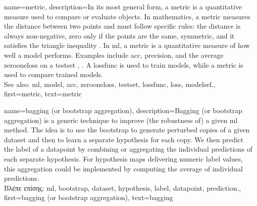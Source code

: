 {name={metric},
	description={In its most general form, a metric is a quantitative measure used to compare or evaluate objects. 
		In mathematics, a metric measures the distance between two points and must follow specific rules: 
		the distance is always non-negative, zero only if the points are the same, symmetric, and it satisfies the 
		triangle inequality \cite{RudinBookPrinciplesMatheAnalysis}. In \gls{ml}, a metric is a quantitative measure 
		of how well a \gls{model} performs. Examples include \gls{acc}, precision, and the average \gls{zerooneloss} 
		on a \gls{testset} \cite{Goodfellow-et-al-2016}, \cite{BishopBook}. A \gls{lossfunc} is used to train \gls{model}s, 
		while a metric is used to compare trained \gls{model}s. 
		\\ See also: \gls{ml}, \gls{model}, \gls{acc}, \gls{zerooneloss}, \gls{testset}, \gls{lossfunc}, \gls{loss}, \gls{modelsel}.},
	first={metric}, text={metric}}


{name={bagging (or bootstrap aggregation)},
	description={Bagging (or bootstrap aggregation) 
		is a generic technique to improve (the robustness of) a given \gls{ml} method. 
		The idea is to use the \gls{bootstrap} to generate perturbed copies of a given \gls{dataset} 
		and then to learn a separate \gls{hypothesis} for each copy. We then predict the 
		\gls{label} of a \gls{datapoint} by combining or aggregating the individual \gls{prediction}s 
		of each separate \gls{hypothesis}. For \gls{hypothesis} maps delivering numeric \gls{label} 
		values, this aggregation could be implemented by computing the average of individual 
		\gls{prediction}s.\\
		\foreignlanguage{greek}{Βλέπε επίσης:} \gls{ml}, \gls{bootstrap}, \gls{dataset}, \gls{hypothesis}, \gls{label}, \gls{datapoint}, \gls{prediction}.},
		first={bagging (or bootstrap aggregation)},
		text={bagging}  
}

